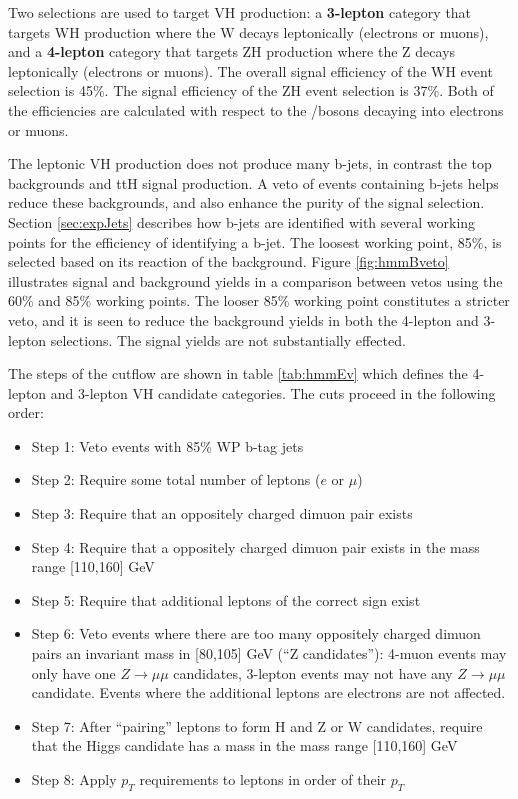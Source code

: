 Two selections are used to target VH production: a \textbf{3-lepton} category that targets WH production where the W decays leptonically (electrons or muons), and a \textbf{4-lepton} category that targets ZH production where the Z decays leptonically (electrons or muons).
The overall signal efficiency of the WH event selection is 45\%.
The signal efficiency of the ZH event selection is 37\%.
Both of the efficiencies are calculated with respect to the \W/\Z bosons decaying into electrons or muons.

The leptonic VH production does not produce many b-jets, in contrast the top backgrounds and ttH signal production.
A veto of events containing b-jets helps reduce these backgrounds, and also enhance the purity of the signal selection.
Section \ref{sec:expJets} describes how b-jets are identified with several working points for the efficiency of identifying a b-jet.
The loosest working point, 85\%, is selected based on its reaction of the background.
Figure \ref{fig:hmmBveto} illustrates signal and background yields in a comparison between vetos using the 60\% and 85\% working points.
The looser 85\% working point constitutes a stricter veto, and it is seen to reduce the background yields in both the 4-lepton and 3-lepton selections.
The signal yields are not substantially effected.

The steps of the cutflow are shown in table \ref{tab:hmmEv} which defines the 4-lepton and 3-lepton VH candidate categories.
The cuts proceed in the following order:
\begin{itemize}
    \item Step 1: Veto events with 85\% WP b-tag jets
    \item Step 2: Require some total number of leptons ($e$ or $\mu$)
    \item Step 3: Require that an oppositely charged dimuon pair exists
    \item Step 4: Require that a oppositely charged dimuon pair exists in the mass range [110,160] GeV
    \item Step 5: Require that additional leptons of the correct sign exist
    \item Step 6: Veto events where there are too many oppositely charged dimuon pairs an invariant mass in [80,105] GeV (``Z candidates''): 4-muon events may only have one $Z\to\mu\mu$ candidates, 3-lepton events may not have any $Z\to\mu\mu$ candidate. Events where the additional leptons are electrons are not affected.
    \item Step 7: After ``pairing'' leptons to form H and Z or W candidates, require that the Higgs candidate has a mass in the mass range [110,160] GeV
    \item Step 8: Apply $p_T$ requirements to leptons in order of their $p_T$
\end{itemize}


